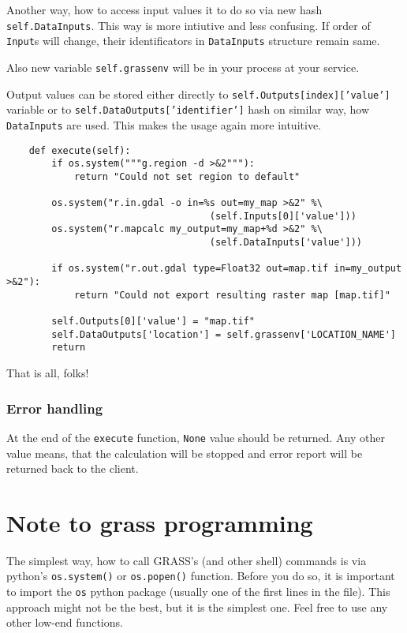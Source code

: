 \documentclass[a4paper,11pt]{article}
\begin{document}
    Another way, how to access input values it to do so via new hash \texttt{self.DataInputs}. This way is 
    more intiutive and less confusing. If order of \texttt{Input}s will change, their identificators in \texttt{DataInputs} structure remain same.
    
    Also new variable \texttt{self.grassenv} will be in your process at your service.

    Output values can be stored either directly to \texttt{self.Outputs[index]['value']} variable or to \texttt{self.DataOutputs['identifier']} hash on similar way, how \texttt{DataInputs} are used. This makes the usage again more intuitive.

    \begin{verbatim}
    def execute(self):
        if os.system("""g.region -d >&2"""):
            return "Could not set region to default"

        os.system("r.in.gdal -o in=%s out=my_map >&2" %\
                                    (self.Inputs[0]['value']))
        os.system("r.mapcalc my_output=my_map+%d >&2" %\
                                    (self.DataInputs['value']))
        
        if os.system("r.out.gdal type=Float32 out=map.tif in=my_output >&2"):
            return "Could not export resulting raster map [map.tif]"

        self.Outputs[0]['value'] = "map.tif"
        self.DataOutputs['location'] = self.grassenv['LOCATION_NAME']
        return
    \end{verbatim}

     
    That is all, folks!
     

    \subsubsection{Error handling}
     
    At the end of the \texttt{execute} function, \texttt{None} value should be returned. Any other 
    value means, that the calculation will be stopped and error report will be returned back to the client.
     


    \section{Note to grass programming}
     
    The simplest way, how to call GRASS's (and other shell) commands is via
    python's \texttt{os.system()} or \texttt{os.popen()} function. 
    Before you do so, it is important to import
    the \texttt{os} python package (usually one of the first lines in the file). This
    approach might not be the best, but it is the simplest one. Feel free to use any other low-end functions.
     
\end{document}

